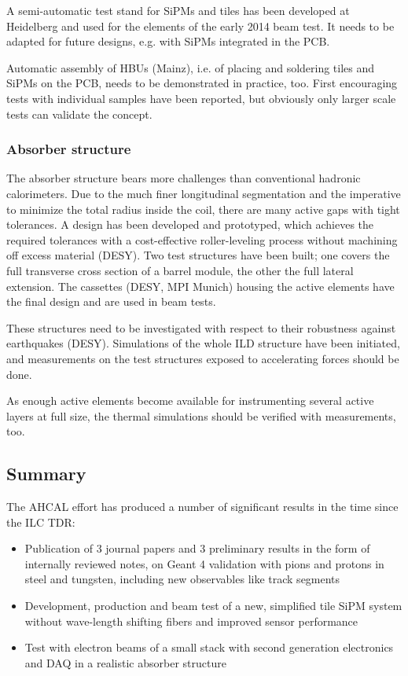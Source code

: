A semi-automatic test stand for SiPMs and tiles has been developed at Heidelberg and used for the elements of the early 2014 beam test. It needs to be adapted for future designs, e.g. with SiPMs integrated in the PCB.

Automatic assembly of HBUs (Mainz), i.e. of placing and soldering tiles and SiPMs on the PCB, needs to be demonstrated in practice, too. First encouraging tests with individual samples have been reported, but obviously only larger scale tests can validate the concept.

\subsubsection{Absorber structure}

The absorber structure bears more challenges than conventional hadronic calorimeters. Due to the much finer longitudinal segmentation and the imperative to minimize the total radius inside the coil, there are many active gaps with tight tolerances. A design has been developed and prototyped, which achieves the required tolerances with a cost-effective roller-leveling process without machining off excess material (DESY). Two test structures have been built; one covers the full transverse cross section of a barrel module, the other the full lateral extension. The cassettes (DESY, MPI Munich) housing the active elements have the final design and are used in beam tests.

These structures need to be investigated with respect to their robustness against earthquakes (DESY). Simulations of the whole ILD structure have been initiated, and measurements on the test structures exposed to accelerating forces should be done.

As enough active elements become available for instrumenting several active layers at full size, the thermal simulations should be verified with measurements, too.

\subsection{Summary}
The AHCAL effort has produced a number of significant results in the time since the ILC TDR:
\begin{itemize}
\item Publication of 3 journal papers and 3 preliminary results in the form of internally reviewed notes, on Geant 4 validation with pions and protons in steel and tungsten, including new observables like track segments
\item Development, production and beam test of a new, simplified tile SiPM system without wave-length shifting fibers and improved sensor performance
\item Test with electron beams of a small stack with second generation electronics and DAQ in a realistic absorber structure
\end{itemize}

